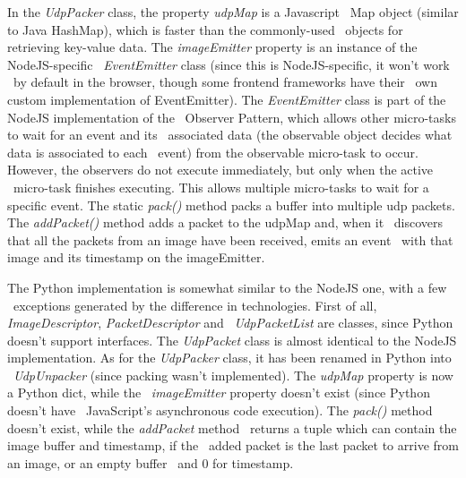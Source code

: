 In the \textit{UdpPacker} class, the property \textit{udpMap} is a Javascript \
Map object (similar to Java HashMap), which is faster than the commonly-used \
objects for retrieving key-value data.
The \textit{imageEmitter} property is an instance of the NodeJS-specific \
\textit{EventEmitter} class (since this is NodeJS-specific, it won't work \
by default in the browser, though some frontend frameworks have their \
own custom implementation of EventEmitter).
The \textit{EventEmitter} class is part of the NodeJS implementation of the \
Observer Pattern, which allows other micro-tasks to wait for an event and its \
associated data (the observable object decides what data is associated to each \
event) from the observable micro-task to occur.
However, the observers do not execute immediately, but only when the active \
micro-task finishes executing.
This allows multiple micro-tasks to wait for a specific event.
The static \textit{pack()} method packs a buffer into multiple udp packets.
The \textit{addPacket()} method adds a packet to the udpMap and, when it \
discovers that all the packets from an image have been received, emits an event \
with that image and its timestamp on the imageEmitter.

The Python implementation is somewhat similar to the NodeJS one, with a few \
exceptions generated by the difference in technologies.
First of all, \textit{ImageDescriptor}, \textit{PacketDescriptor} and \
\textit{UdpPacketList} are classes, since Python doesn't support interfaces.
The \textit{UdpPacket} class is almost identical to the NodeJS implementation.
As for the \textit{UdpPacker} class, it has been renamed in Python into \
\textit{UdpUnpacker} (since packing wasn't implemented).
The \textit{udpMap} property is now a Python dict, while the \
\textit{imageEmitter} property doesn't exist (since Python doesn't have \
JavaScript's asynchronous code execution).
The \textit{pack()} method doesn't exist, while the \textit{addPacket} method \
returns a tuple which can contain the image buffer and timestamp, if the \
added packet is the last packet to arrive from an image, or an empty buffer \
and 0 for timestamp.


